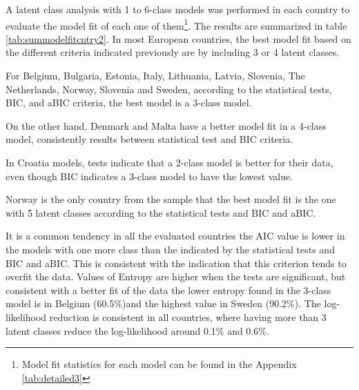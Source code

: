 \documentclass[12pt,a4paper,oneside]{reedthesis}
\begin{document}
A latent class analysis with 1 to 6-class models was performed in each country to evaluate the model fit of each one of them\footnote{Model fit statistics for each model can be found in the Appendix \ref{tab:detailed3}}. The results are summarized in table \ref{tab:summodelfitcntry2}. In most European countries, the best model fit based on the different criteria indicated previously are by including 3 or 4 latent classes.

For Belgium, Bulgaria, Estonia, Italy, Lithuania, Latvia, Slovenia, The Netherlands, Norway, Slovenia and Sweden, according to the statistical tests, BIC, and aBIC criteria, the best model is a 3-class model.

On the other hand, Denmark and Malta have a better model fit in a 4-class model, consistently results between statistical test and BIC criteria.

In Croatia models, tests indicate that a 2-class model is better for their data, even though BIC indicates a 3-class model to have the lowest value.

Norway is the only country from the sample that the best model fit is the one with 5 latent classes according to the statistical tests and BIC and aBIC.

It is a common tendency in all the evaluated countries the AIC value is lower in the models with one more class than the indicated by the statistical tests and BIC and aBIC. This is consistent with the indication that this criterion tends to overfit the data. Values of Entropy are higher when the tests are significant, but consistent with a better fit of the data the lower entropy found in the 3-class model is in Belgium (60.5\%)and the highest value in Sweden (90.2\%). The log-likelihood reduction is consistent in all countries, where having more than 3 latent classes reduce the log-likelihood around 0.1\% and 0.6\%.
\end{document}
